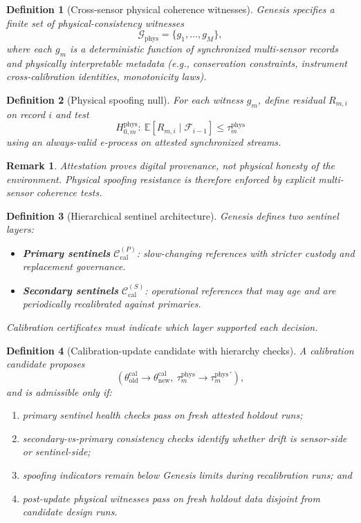\documentclass[11pt,a4paper]{article}
\newtheorem{definition}{Definition}[section]
\newtheorem{remark}{Remark}[section]
\begin{document}
\begin{definition}[Cross-sensor physical coherence witnesses]
Genesis specifies a finite set of physical-consistency witnesses
\[
\mathcal{G}_{\mathrm{phys}}=\{g_1,\dots,g_M\},
\]
where each $g_m$ is a deterministic function of synchronized multi-sensor records and physically interpretable metadata (e.g., conservation constraints, instrument cross-calibration identities, monotonicity laws).
\end{definition}

\begin{definition}[Physical spoofing null]
For each witness $g_m$, define residual $R_{m,i}$ on record $i$ and test
\[
H^{\mathrm{phys}}_{0,m}:\ \mathbb{E}[R_{m,i}\mid \mathcal{F}_{i-1}]\le \tau^{\mathrm{phys}}_m
\]
using an always-valid e-process on attested synchronized streams.
\end{definition}

\begin{remark}
Attestation proves digital provenance, not physical honesty of the environment.
Physical spoofing resistance is therefore enforced by explicit multi-sensor coherence tests.
\end{remark}

\begin{definition}[Hierarchical sentinel architecture]
Genesis defines two sentinel layers:
\begin{itemize}[leftmargin=*]
\item \textbf{Primary sentinels} $\mathcal{C}_{\mathrm{cal}}^{(P)}$: slow-changing references with stricter custody and replacement governance.
\item \textbf{Secondary sentinels} $\mathcal{C}_{\mathrm{cal}}^{(S)}$: operational references that may age and are periodically recalibrated against primaries.
\end{itemize}
Calibration certificates must indicate which layer supported each decision.
\end{definition}

\begin{definition}[Calibration-update candidate with hierarchy checks]
A calibration candidate proposes
\[
(\theta^{\mathrm{cal}}_{\mathrm{old}}\to \theta^{\mathrm{cal}}_{\mathrm{new}},\ \tau^{\mathrm{phys}}_m\to \tau^{\mathrm{phys}\,'}_m),
\]
and is admissible only if:
\begin{enumerate}[leftmargin=*]
\item primary sentinel health checks pass on fresh attested holdout runs;
\item secondary-vs-primary consistency checks identify whether drift is sensor-side or sentinel-side;
\item spoofing indicators remain below Genesis limits during recalibration runs; and
\item post-update physical witnesses pass on fresh holdout data disjoint from candidate design runs.
\end{enumerate}
\end{definition}
\end{document}
